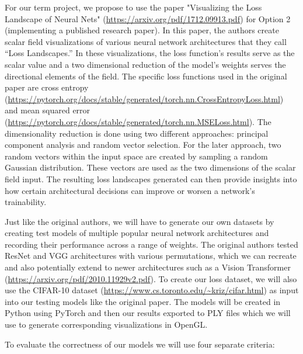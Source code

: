 \documentclass{acmsiggraph}               %
\begin{document}


For our term project, we propose to use the paper "Visualizing the Loss Landscape of Neural Nets" (\url{https://arxiv.org/pdf/1712.09913.pdf}) for Option 2 (implementing a published research paper). 
In this paper, the authors create scalar field visualizations of various neural network architectures that they call “Loss Landscapes.” In these visualizations, the loss function’s results serve as the scalar value and a two dimensional reduction of the model’s weights serves the directional elements of the field. 
The specific loss functions used in the original paper are cross entropy (\url{https://pytorch.org/docs/stable/generated/torch.nn.CrossEntropyLoss.html}) and mean squared error (\url{https://pytorch.org/docs/stable/generated/torch.nn.MSELoss.html}). 
The dimensionality reduction is done using two different approaches: principal component analysis and random vector selection. 
For the later approach, two random vectors within the input space are created by sampling a random Gaussian distribution. These vectors are used as the two dimensions of the scalar field input.
The resulting loss landscapes generated can then provide insights into how certain architectural decisions can improve or worsen a network's trainability.

Just like the original authors, we will have to generate our own datasets by creating test models of multiple popular neural network architectures and recording their performance across a range of weights. 
The original authors tested ResNet and VGG architectures with various permutations, which we can recreate and also potentially extend to newer architectures such as a Vision Transformer (\url{https://arxiv.org/pdf/2010.11929v2.pdf}). 
To create our loss dataset, we will also use the CIFAR-10 dataset (\url{https://www.cs.toronto.edu/~kriz/cifar.html}) as input into our testing models like the original paper. 
The models will be created in Python using PyTorch and then our results exported to PLY files which we will use to generate corresponding visualizations in OpenGL.

To evaluate the correctness of our models we will use four separate criteria:
\end{document}
